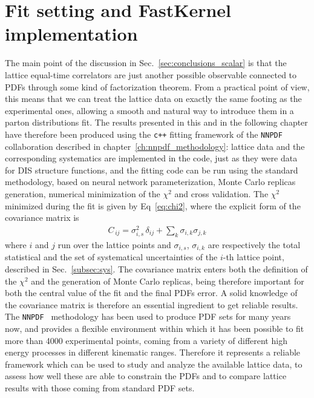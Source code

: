 \section{Fit setting and FastKernel implementation}
\label{sec:fk_qpdf}
The main point of the discussion in Sec.~\ref{sec:conclusions_scalar} is that the lattice equal-time correlators 
are just another possible observable connected to PDFs through some kind of factorization theorem.
From a practical point of view, this means that we can treat the lattice data on
exactly the same footing as the experimental ones, allowing a smooth and natural
way to introduce them in a parton distributions fit. The results presented in this and in the following
chapter have therefore been produced using the {\tt c++} fitting framework of the {\tt NNPDF} collaboration
described in chapter~\ref{ch:nnpdf_methodology}: lattice data and the corresponding systematics
are implemented in the code, just as they were data for DIS structure functions, and the fitting code
can be run using the standard methodology, based on neural network parameterization, Monte Carlo replicas generation,
numerical minimization of the $\chi^2$ and cross validation.
The $\chi^2$ minimized during the fit is given by Eq~\eqref{eq:chi2}, where the explicit form of the 
covariance matrix is
\begin{align}
	\label{eq:covariance}
    C_{\,ij} = \sigma_{i,s}^2\, \delta_{ij} + \sum_k \sigma_{i,k} \sigma_{j,k} 
\end{align}
where $i$ and $j$ run over the lattice points and $\sigma_{i,s}$, $\sigma_{i,k}$ 
are respectively the total statistical and the set of  systematical uncertainties
of the $i$-th lattice point, described in Sec.~\ref{subsec:sys}.
The covariance matrix enters both the definition of the $\chi^2$  
and the generation of Monte Carlo replicas,
being therefore important for both the central value of the fit and the final PDFs error. A solid knowledge 
of the covariance matrix is therefore an essential ingredient to get reliable results.
The {\tt NNPDF } methodology has been used to produce PDF sets for many years now, and provides a flexible environment
within which it has been possible to fit more than 4000 experimental points, coming from a variety 
of different high energy processes in different kinematic ranges.
Therefore it represents a reliable framework which can be used to study and analyze the available lattice data, to assess
how well these are able to constrain the PDFs and to compare lattice results with those coming from standard PDF sets.


